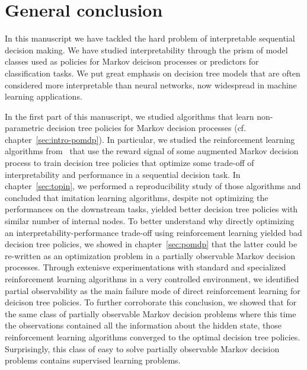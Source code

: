 \chapter*{General conclusion}
In this manuscript we have tackled the hard problem of interpretable sequential decision making.
We have studied interpretability through the prism of model classes used as policies for Markov deicison processes or predictors for classification tasks.
We put great emphasis on decision tree models that are often considered more interpretable than neural networks, now widespread in machine learning applications.

In the first part of this manuscript, we studied algorithms that learn non-parametric decision tree policies for Markov decision processes (cf. chapter~\ref{sec:intro-pomdp}).
In particular, we studied the reinforcement learning algorithms from~\cite{topin2021iterative} that use the reward signal of some augmented Markov decision process to train decision tree policies that optimize some trade-off of interpretability and performance in a sequential decision task.
In chapter~\ref{sec:topin}, we performed a reproducibility study of those algorithms and concluded that imitation learning algorithms, despite not optimizing the performances on the downstream tasks, yielded better decision tree policies with similar number of internal nodes.
To better understand why directly optimizing an interpretability-performance trade-off using reinforcement learning yielded bad decision tree policies, we showed in chapter~\ref{sec:pomdp} that the latter could be re-written as an optimization problem in a partially observable Markov decision processes.
Through extenisve experimentations with standard and specialized reinforcement learning algorithms in a very controlled environment, we identified partial observability as the main failure mode of direct reinforcement learning for deicison tree policies.
To further corroborate this conclusion, we showed that for the same class of partially observable Markov decision problems where this time the observations contained all the information about the hidden state, those reinforcement learning algorithms converged to the optimal decision tree policies.
Surprisingly, this class of easy to solve partially observable Markov decision problems contains supervised learning problems.

